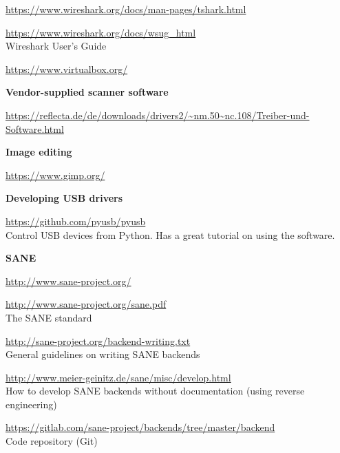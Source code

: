 \documentclass{article}
\begin{document}
\begin{thebibliography}{}
  \url{https://www.wireshark.org/docs/man-pages/tshark.html}
  
  \url{https://www.wireshark.org/docs/wsug_html} \\
  Wireshark User's Guide

  \url{https://www.virtualbox.org/}

  \item[]\hspace{-\labelwidth}\hspace{-\labelsep}\textbf{Vendor-supplied scanner software}

  \url{https://reflecta.de/de/downloads/drivers2/~nm.50~nc.108/Treiber-und-Software.html}

  \item[]\hspace{-\labelwidth}\hspace{-\labelsep}\textbf{Image editing}

  \url{https://www.gimp.org/}

  \item[]\hspace{-\labelwidth}\hspace{-\labelsep}\textbf{Developing USB drivers}

  \url{https://github.com/pyusb/pyusb} \\
  Control USB devices from Python. Has a great tutorial on using the software.
  
  \item[]\hspace{-\labelwidth}\hspace{-\labelsep}\textbf{SANE}
  
  \url{http://www.sane-project.org/}
  
  \url{http://www.sane-project.org/sane.pdf} \\
  The SANE standard
  
  \url{http://sane-project.org/backend-writing.txt} \\
  General guidelines on writing SANE backends
  
  \url{http://www.meier-geinitz.de/sane/misc/develop.html} \\
  How to develop SANE backends without documentation (using reverse engineering)
  
  \url{https://gitlab.com/sane-project/backends/tree/master/backend} \\
  Code repository (Git)
\end{thebibliography}
\end{document}
